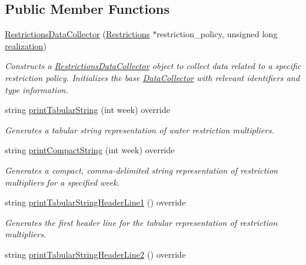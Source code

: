 \subsection*{Public Member Functions}
\begin{DoxyCompactItemize}
\item 
\mbox{\hyperlink{classRestrictionsDataCollector_a0e700f013442a6df86fe75bcee4c31df}{Restrictions\+Data\+Collector}} (\mbox{\hyperlink{classRestrictions}{Restrictions}} $\ast$restriction\+\_\+policy, unsigned long \mbox{\hyperlink{classDataCollector_a9ef2887466fe3123aa19ef956a219b96}{realization}})
\begin{DoxyCompactList}\small\item\em Constructs a {\ttfamily \mbox{\hyperlink{classRestrictionsDataCollector}{Restrictions\+Data\+Collector}}} object to collect data related to a specific restriction policy. Initializes the base {\ttfamily \mbox{\hyperlink{classDataCollector}{Data\+Collector}}} with relevant identifiers and type information. \end{DoxyCompactList}\item 
string \mbox{\hyperlink{classRestrictionsDataCollector_a45e5612e70ec98430e31271f68ca407e}{print\+Tabular\+String}} (int week) override
\begin{DoxyCompactList}\small\item\em Generates a tabular string representation of water restriction multipliers. \end{DoxyCompactList}\item 
string \mbox{\hyperlink{classRestrictionsDataCollector_ab8b8c30dca6b2e41c1ef5e3ac7e29813}{print\+Compact\+String}} (int week) override
\begin{DoxyCompactList}\small\item\em Generates a compact, comma-\/delimited string representation of restriction multipliers for a specified week. \end{DoxyCompactList}\item 
string \mbox{\hyperlink{classRestrictionsDataCollector_a2676a6693b254997d223fc1c437258ab}{print\+Tabular\+String\+Header\+Line1}} () override
\begin{DoxyCompactList}\small\item\em Generates the first header line for the tabular representation of restriction multipliers. \end{DoxyCompactList}\item 
string \mbox{\hyperlink{classRestrictionsDataCollector_afb3c49c2c9b152bb2372e2fcc198e1b8}{print\+Tabular\+String\+Header\+Line2}} () override

\end{DoxyCompactItemize}
